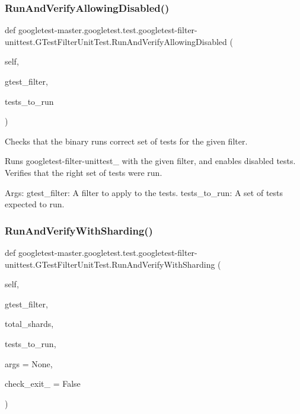 \subsubsection{\texorpdfstring{RunAndVerifyAllowingDisabled()}{RunAndVerifyAllowingDisabled()}}
{\footnotesize\ttfamily def googletest-\/master.\+googletest.\+test.\+googletest-\/filter-\/unittest.\+G\+Test\+Filter\+Unit\+Test.\+Run\+And\+Verify\+Allowing\+Disabled (\begin{DoxyParamCaption}\item[{}]{self,  }\item[{}]{gtest\+\_\+filter,  }\item[{}]{tests\+\_\+to\+\_\+run }\end{DoxyParamCaption})}

\begin{DoxyVerb}Checks that the binary runs correct set of tests for the given filter.

Runs googletest-filter-unittest_ with the given filter, and enables
disabled tests. Verifies that the right set of tests were run.

Args:
  gtest_filter: A filter to apply to the tests.
  tests_to_run: A set of tests expected to run.
\end{DoxyVerb}
 \mbox{\label{classgoogletest-master_1_1googletest_1_1test_1_1googletest-filter-unittest_1_1_g_test_filter_unit_test_afac3ac76451fb6f13b43870dfa83eac9}} 
\subsubsection{\texorpdfstring{RunAndVerifyWithSharding()}{RunAndVerifyWithSharding()}}
{\footnotesize\ttfamily def googletest-\/master.\+googletest.\+test.\+googletest-\/filter-\/unittest.\+G\+Test\+Filter\+Unit\+Test.\+Run\+And\+Verify\+With\+Sharding (\begin{DoxyParamCaption}\item[{}]{self,  }\item[{}]{gtest\+\_\+filter,  }\item[{}]{total\+\_\+shards,  }\item[{}]{tests\+\_\+to\+\_\+run,  }\item[{}]{args = {\ttfamily None},  }\item[{}]{check\+\_\+exit\+\_ = {\ttfamily False} }\end{DoxyParamCaption})}

